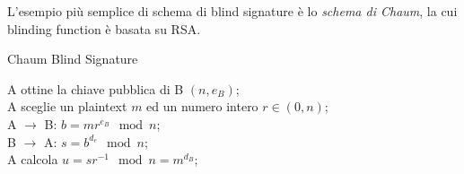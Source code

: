 L'esempio più semplice di schema di blind signature è lo \textit{schema di Chaum}, la cui blinding function è basata su RSA.

\bigskip
\begin{algorithm}[H]
  \caption{Chaum Blind Signature}
  \label{alg:authentication-blind-signature-chaum}
  \SetAlgoNoLine
  A ottine la chiave pubblica di B $(n,e_{B})$;\\
  A sceglie un plaintext $m$ ed un numero intero $r \in (0,n)$;\\
  A $\rightarrow$ B: $b=mr^{e_{B}} \mod n$;\\
  B $\rightarrow$ A: $s=b^{d_{e}} \mod n$;\\
  A calcola $u=sr^{-1} \mod n=m^{d_{B}}$;
\end{algorithm}
